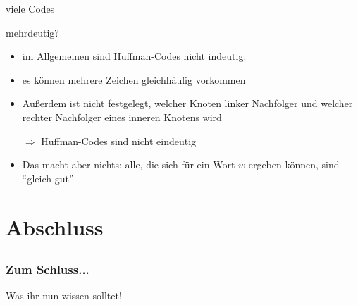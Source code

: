\begin{frame}{viele Codes}
	\begin{block}{mehrdeutig?}
    \begin{itemize}
      \item im Allgemeinen sind Huffman-Codes nicht indeutig:
		\item es können mehrere Zeichen gleichhäufig vorkommen
		\item Außerdem ist nicht festgelegt, welcher Knoten linker Nachfolger und welcher rechter Nachfolger eines inneren Knotens wird

		\item[$\Rightarrow$] Huffman-Codes sind nicht eindeutig
		\item Das macht aber nichts: alle, die sich für ein Wort $w$ ergeben können, sind "`gleich gut"'
	\end{itemize}
	\end{block}

\end{frame}


\section{Abschluss}
\subsection*{}
\begin{frame}
	\frametitle{Zum Schluss...}
	\begin{block}{Was ihr nun wissen solltet!}
	\begin{itemize}
	\end{itemize}
	\end{block}

\end{frame}
